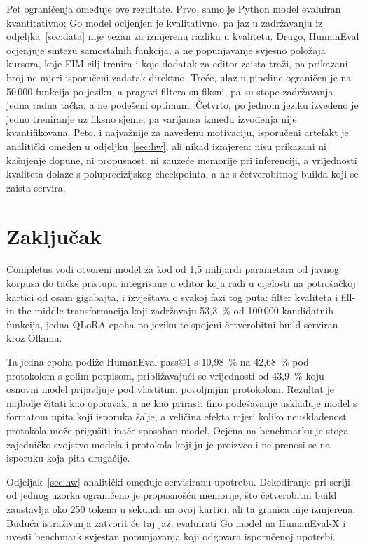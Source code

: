 \documentclass[10pt,conference,a4paper]{IEEEtran}
\begin{document}
Pet ograničenja omeđuje ove rezultate. Prvo, samo je Python model evaluiran
kvantitativno; Go model ocijenjen je kvalitativno, pa jaz u zadržavanju iz
odjeljka~\ref{sec:data} nije vezan za izmjerenu razliku u kvalitetu. Drugo, HumanEval
ocjenjuje sintezu samostalnih funkcija, a ne popunjavanje svjesno položaja
kursora, koje FIM cilj trenira i koje dodatak za editor zaista traži, pa
prikazani broj ne mjeri isporučeni zadatak direktno. Treće, ulaz u pipeline
ograničen je na 50\,000 funkcija po jeziku, a pragovi filtera su fiksni, pa su
stope zadržavanja jedna radna tačka, a ne podešeni optimum. Četvrto, po jednom
jeziku izvedeno je jedno treniranje uz fiksno sjeme, pa varijansa između
izvođenja nije kvantifikovana. Peto, i najvažnije za navedenu motivaciju,
isporučeni artefakt je analitički omeđen u odjeljku~\ref{sec:hw}, ali nikad izmjeren:
nisu prikazani ni kašnjenje dopune, ni propusnost, ni zauzeće memorije pri
inferenciji, a vrijednosti kvaliteta dolaze s poluprecizijskog checkpointa, a ne s
četverobitnog builda koji se zaista servira.

\section{Zaključak}
Completus vodi otvoreni model za kod od 1,5 milijardi parametara od javnog
korpusa do tačke pristupa integrisane u editor koja radi u cijelosti na
potrošačkoj kartici od osam gigabajta, i izvještava o svakoj fazi tog puta:
filter kvaliteta i fill-in-the-middle transformacija koji zadržavaju
53,3~\% od 100\,000 kandidatnih funkcija, jedna QLoRA epoha po jeziku te
spojeni četverobitni build serviran kroz Ollamu.

Ta jedna epoha podiže HumanEval pass@1 s 10,98~\% na 42,68~\% pod protokolom
s golim potpisom, približavajući se vrijednosti od 43,9~\% koju osnovni model
prijavljuje pod vlastitim, povoljnijim protokolom. Rezultat je najbolje čitati
kao oporavak, a ne kao prirast: fino podešavanje usklađuje model s formatom
upita koji isporuka šalje, a veličina efekta mjeri koliko neusklađenost
protokola može prigušiti inače sposoban model. Ocjena na benchmarku je stoga
zajedničko svojstvo modela i protokola koji ju je proizveo i ne prenosi se na
isporuku koja pita drugačije.

Odjeljak~\ref{sec:hw} analitički omeđuje servisiranu upotrebu. Dekodiranje
pri seriji od jednog uzorka ograničeno je propusnošću memorije, što
četverobitni build zaustavlja oko 250 tokena u sekundi na ovoj kartici, ali ta
granica nije izmjerena. Buduća istraživanja zatvorit će taj jaz, evaluirati Go
model na HumanEval-X i uvesti benchmark svjestan popunjavanja koji odgovara
isporučenoj upotrebi.
\end{document}
